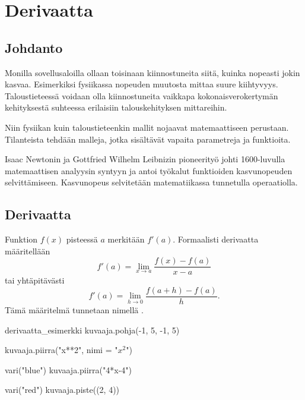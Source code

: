 \chapter{Derivaatta}


\section{Johdanto}

Monilla sovellusaloilla ollaan toisinaan kiinnostuneita siitä, kuinka nopeasti jokin kasvaa.
Esimerkiksi fysiikassa nopeuden muutosta mittaa suure kiihtyvyys. Taloustieteessä voidaan olla
kiinnostuneita vaikkapa kokonaisverokertymän kehityksestä suhteessa erilaisiin talouskehityksen mittareihin.

Niin fysiikan kuin taloustieteenkin mallit nojaavat matemaattiseen perustaan.
Tilanteista tehdään malleja, jotka sisältävät vapaita parametreja ja funktioita.

Isaac Newtonin ja Gottfried Wilhelm Leibnizin pioneerityö johti 1600-luvulla
matemaattisen analyysin syntyyn ja antoi työkalut funktioiden kasvunopeuden selvittämiseen.
Kasvunopeus selvitetään matematiikassa  tunnetulla operaatiolla.

\section{Derivaatta}

Funktion $f(x)$  pisteessä $a$ merkitään $f'(a)$.
Formaalisti derivaatta määritellään
\[ f'(a) = \lim\limits_{x \to a} \frac{f(x)-f(a)}{x-a} \]
tai yhtäpitävästi
\[ f'(a) = \lim\limits_{h \to 0} \frac{f(a+h)-f(a)}{h}. \]
Tämä määritelmä tunnetaan nimellä .

\begin{luoKuva}{derivaatta_esimerkki}
    kuvaaja.pohja(-1, 5, -1, 5)
    
    kuvaaja.piirra("x**2", nimi = "$x^2$")
    
    vari("blue")
    kuvaaja.piirra("4*x-4")
   
    vari("red")
    kuvaaja.piste((2, 4))
\end{luoKuva}

